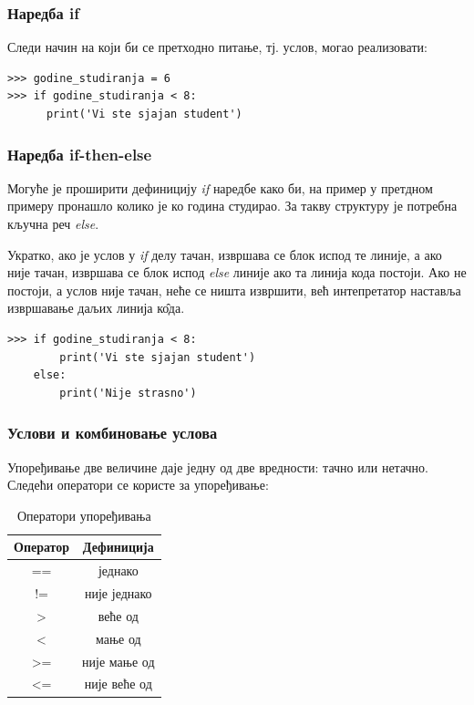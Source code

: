 \subsubsection{Наредба if}

Следи начин на који би се претходно питање, тј. услов, могао реализовати:

\begin{lstlisting}[caption = Пример услова, label = if]
>>> godine_studiranja = 6
>>> if godine_studiranja < 8:
      print('Vi ste sjajan student')
\end{lstlisting}

\subsubsection{Наредба if-then-else}

Могуће је проширити дефиницију \emph{if} наредбе како би, на пример у претдном примеру пронашло колико је ко година студирао. За такву структуру је потребна кључна реч \emph{else}.

Укратко, ако је услов у \emph{if} делу тачан, извршава се блок испод те линије, а ако није тачан, извршава се блок испод \emph{else} линије ако та линија кода постоји. Ако не постоји, а услов није тачан, неће се ништа извршити, већ интепретатор наставља извршавање даљих линија к\^{о}да.

\begin{lstlisting}[caption = Пример за наредбе IF - ELSE, label = ifelse]
>>> if godine_studiranja < 8:
        print('Vi ste sjajan student')
    else:
        print('Nije strasno')
\end{lstlisting}

\subsubsection{Услови и комбиновање услова}

Упоређивање две величине даје једну од две вредности: тачно или нетачно. Следећи оператори се користе за упоређивање:

\begin{table}[here]
\centering
\begin{tabular}{|c|c|} \hline
\textbf{Оператор} & \textbf{Дефиниција} \\ \hline \hline
== & једнако \\ \hline
!= & није једнако \\ \hline
> & веће од  \\ \hline
< & мање од \\ \hline
>= & није мање од \\ \hline
<= & није веће од \\ \hline
\end{tabular}\medskip
\caption{Оператори упоређивања}
\label{tabele:opporedjenja}
\end{table}

